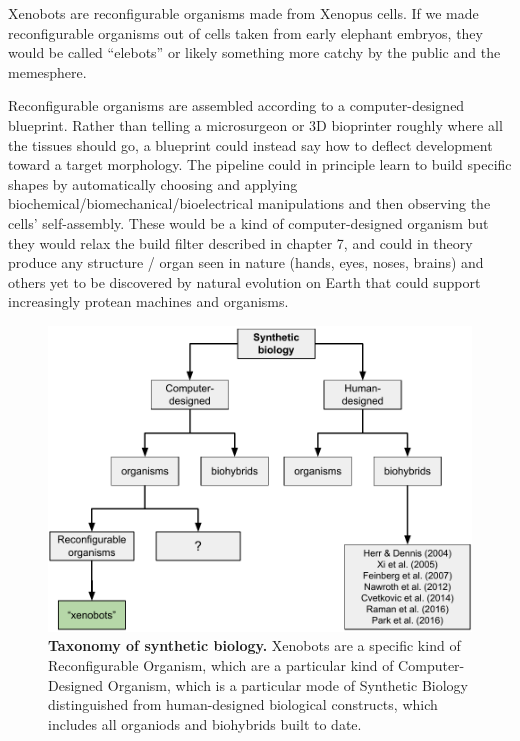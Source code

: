 Xenobots are reconfigurable organisms made from Xenopus cells.
If we made reconfigurable organisms out of cells taken from early elephant embryos, they would be called ``elebots'' or likely something more catchy by the public and the memesphere.

Reconfigurable organisms are assembled according to a computer-designed blueprint.
Rather than telling a microsurgeon or 3D bioprinter roughly where all the tissues should go, 
a blueprint could instead say how to deflect development toward a target morphology.
The pipeline could in principle learn to build specific shapes by automatically choosing and applying biochemical/biomechanical/bioelectrical
manipulations and then observing the cells' self-assembly.
These would be a kind of computer-designed organism but they would relax the build filter described in chapter 7, and could in theory produce any structure / organ seen in nature (hands, eyes, noses, brains) and others yet to be discovered by natural evolution on Earth that could support increasingly protean machines and organisms.


\begin{figure}
    \centering
    \includegraphics[width=\linewidth]{fig/synthbio.pdf}
    \vspace{1pt}
    \caption{%
    \textbf{Taxonomy of synthetic biology.}
    Xenobots are a specific kind of Reconfigurable Organism, which are a particular kind of Computer-Designed Organism, which is a particular mode of Synthetic Biology distinguished from human-designed biological constructs, which includes all organiods and biohybrids built to date.
    \label{fig:synthbio}%
    }
\end{figure}


